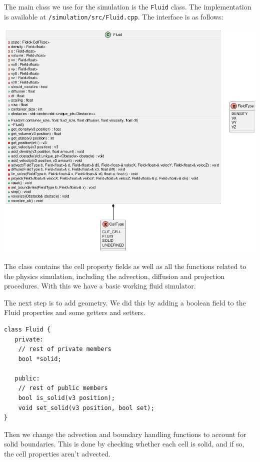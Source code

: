 \documentclass[a4paper,12pt]{article}
\begin{document}
The main class we use for the simulation is the \verb|Fluid| class. The implementation
is available at \verb|/simulation/src/Fluid.cpp|. The interface is as follows: \\
\begin{center}
	\includegraphics[width=\textwidth]{resources/Fluid.png}
\end{center}

The class contains the cell property fields as well as all the functions related
to the physics simulation, including the advection, diffusion and projection procedures.
With this we have a basic working fluid simulator.

The next step is to add geometry. We did this by adding a boolean field to the
Fluid properties and some getters and setters.
\begin{lstlisting}
class Fluid {
   private:
	// rest of private members
	bool *solid;

   public:
	// rest of public members
	bool is_solid(v3 position);
	void set_solid(v3 position, bool set);
}
\end{lstlisting}
Then we change the advection and boundary handling functions to account for
solid boundaries. This is done by checking whether each cell is solid, and if
so, the cell properties aren't advected.
\end{document}
